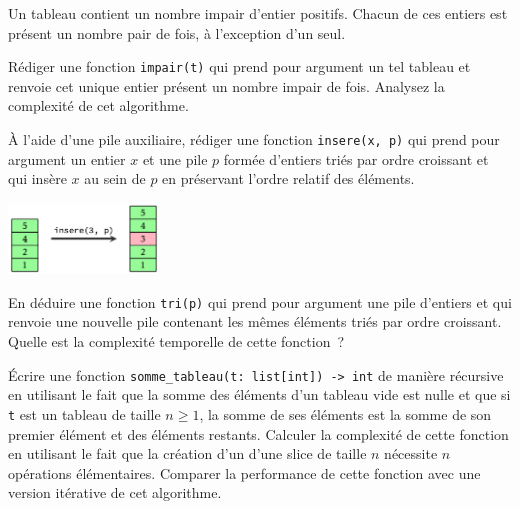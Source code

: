 \documentclass{magnolia}
\begin{document}
Un tableau contient un nombre impair d'entier positifs. Chacun de ces entiers est présent un
nombre pair de fois, à l'exception d'un seul.
\begin{questions}
\question Rédiger une fonction \verb!impair(t)! qui prend pour argument un tel tableau et
  renvoie cet unique entier présent un nombre impair de fois.
\question Analysez la complexité de cet algorithme.
\end{questions}

\begin{questions}
\question
À l'aide d'une pile auxiliaire, rédiger une fonction \verb!insere(x, p)! qui prend pour
argument un entier $x$ et une pile $p$ formée d'entiers triés par ordre croissant et qui
insère $x$ au sein de $p$ en préservant l'ordre relatif des éléments.
\begin{center}
\includegraphics[width=0.3\textwidth]{../../Commun/Images/python-exos-tableau-2.pdf}
\end{center}
\question En déduire une fonction \verb!tri(p)! qui prend pour argument une pile d'entiers
  et qui renvoie une nouvelle pile contenant les mêmes éléments triés par ordre croissant.
\question Quelle est la complexité temporelle de cette fonction~?
\end{questions}




Écrire une fonction \verb!somme_tableau(t: list[int]) -> int! de manière
récursive en utilisant le fait que la somme des éléments d'un tableau vide est
nulle et que si \verb!t! est un tableau de taille $n\geq 1$, la somme de ses
éléments est la somme de son premier élément et des éléments restants.
Calculer la complexité de cette fonction en utilisant le fait que la création d'un
d'une slice de taille $n$ nécessite $n$ opérations élémentaires.
Comparer la performance de cette fonction avec une version itérative de cet algorithme.
\end{document}

